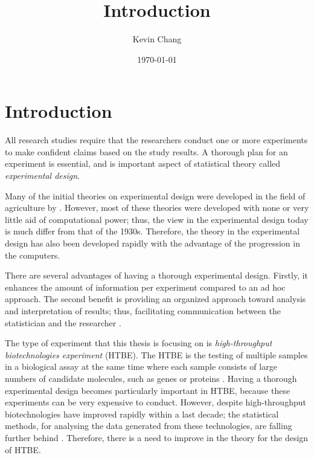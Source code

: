 \documentclass[11pt,a4paper]{article}
\begin{document}
\title{Introduction}
\author{Kevin Chang}
\date{\today}
\maketitle


\section{Introduction}
All research studies require that the researchers conduct one or more experiments to make confident claims based on the study results. A thorough plan for an experiment is essential, and is important aspect of statistical theory called \emph{experimental design}. 

Many of the initial theories on experimental design were developed in the field of agriculture by \cite{Fisher1935}. However, most of these theories were developed with none or very little aid of computational power; thus, the view in the experimental design today is much differ from that of the 1930s. Therefore, the theory in the experimental design has also been developed rapidly with the advantage of the progression in the computers. 
 
There are several advantages of having a thorough experimental design. Firstly, it enhances the amount of information per experiment compared to an ad hoc approach. The second benefit is providing an organized approach toward analysis and interpretation of results; thus, facilitating communication between the statistician and the researcher \citep{Doyle2009}. 

The type of experiment that this thesis is focusing on is \emph{high-throughput biotechnologies experiment} (HTBE). The HTBE is the testing of multiple samples in a biological assay at the same time where each sample consists of large numbers of candidate molecules, such as genes or proteins \citep{Janzen2002}. Having a thorough experimental design becomes particularly important in HTBE, because these experiments can be very expensive to conduct. However, despite high-throughput biotechnologies have improved rapidly within a last decade; the statistical methods, for analysing the data generated from these technologies, are falling further behind \citep{Doyle2009}. Therefore, there is a need to improve in the theory for the design of HTBE. 
\end{document}
